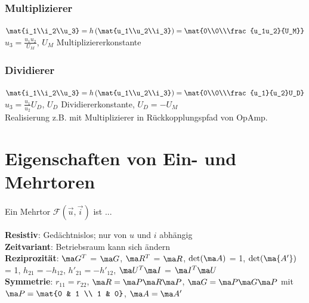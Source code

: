 \documentclass[fs, footer]{latex4ei}
\begin{document}
\begin{multicols*}{4}
    \subsubsection{Multiplizierer}
    $\mat{i_1\\i_2\\u_3} = h\left(\mat{u_1\\u_2\\i_3}\right) = \mat{0\\0\\\frac{u_1u_2}{U_M}}$\quad$u_3=\frac{u_1u_2}{U_M}$, $U_M$ Multipliziererkonstante

    \subsubsection{Dividierer}
    $\mat{i_1\\i_2\\u_3} = h\left(\mat{u_1\\u_2\\i_3}\right) = \mat{0\\0\\\frac{u_1}{u_2}U_D}$\quad$u_3=\frac{u_1}{u_2}U_D$, $U_D$ Dividiererkonstante, $U_D = -U_M$\\
    Realisierung z.B. mit Multiplizierer in Rückkopplungspfad von OpAmp.
    \section{Eigenschaften von Ein- und Mehrtoren}
    Ein Mehrtor $\mathcal F(\vec u, \vec i)$ ist ...

    \textbf{Resistiv}: Gedächtnislos; nur von $u$ und $i$ abhängig\\
    \textbf{Zeitvariant}: Betriebsraum kann sich ändern\\
    \textbf{Reziprozität}: $\ma G^T$ = $\ma G$, $\ma R^T$ = $\ma R$, $\det (\ma A)$ = 1, $\det (\ma {A'})$ = 1, $h_{21} = -h_{12}$, $h'_{21} = -h'_{12}$, $\ma U^T\ma I$ = $\ma I^T\ma U$\\
    \textbf{Symmetrie}: $r_{11} = r_{22}$, $\ma R = \ma P\ma R\ma P$, $\ma G = \ma P \ma G \ma P$ mit $\ma P = \mat{0 & 1 \\ 1 & 0}$, $\ma A = \ma A'$


\end{multicols*}
\end{document}
